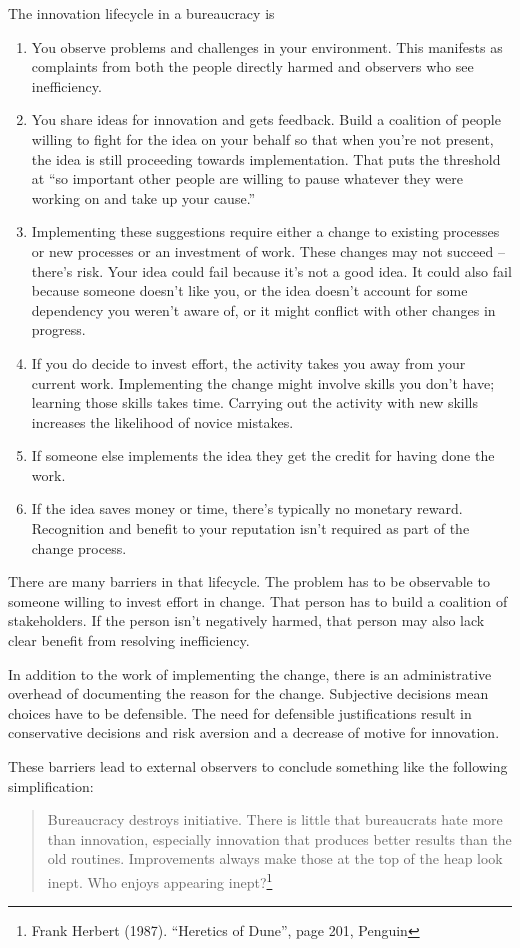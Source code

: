 The innovation lifecycle in a bureaucracy is
\begin{enumerate}
    \item You observe problems and challenges in your environment. This manifests as complaints from both the people directly harmed and observers who see inefficiency.
    \item You share ideas for innovation and gets feedback. Build a coalition of people willing to fight for the idea on your behalf
    so that when you're not present, the idea is still proceeding towards implementation.  That puts the threshold at ``so important other people are willing to pause whatever they were working on and take up your cause.''
    \item Implementing these suggestions require either a change to existing processes or new processes or an investment of work. These changes may not succeed -- there's risk. Your idea could fail because it's not a good idea. It could also fail because someone doesn't like you, or the idea doesn't account for some dependency you weren't aware of, or it might conflict with other changes in progress.
    \item If you do decide to invest effort, the activity takes you away from your current work. Implementing the change might involve skills you don't have; learning those skills takes time. Carrying out the activity with new skills increases the likelihood of novice mistakes.
    \item If someone else implements the idea they get the credit for having done the work.
    \item If the idea saves money or time, there's typically no monetary reward. Recognition and benefit to your reputation isn't required as part of the change process. 
\end{enumerate}

There are many barriers in that lifecycle. The problem has to be observable to someone willing to invest effort in change. That person has to build a coalition of stakeholders. If the person isn't negatively harmed, that person may also lack clear benefit from resolving inefficiency. 

In addition to the work of implementing the change, there is an administrative overhead of documenting the reason for the change. 
Subjective decisions mean choices have to be defensible. 
The need for defensible justifications result in conservative decisions and risk aversion and a decrease of motive for innovation. 



These barriers lead to external observers to conclude something like the following simplification:
\begin{quote}
Bureaucracy destroys initiative. There is little that bureaucrats hate more than innovation, especially innovation that produces better results than the old routines.
Improvements always make those at the top of the heap look inept. Who enjoys appearing inept?\footnote{Frank Herbert (1987). ``Heretics of Dune'', page 201, Penguin}
\end{quote}

